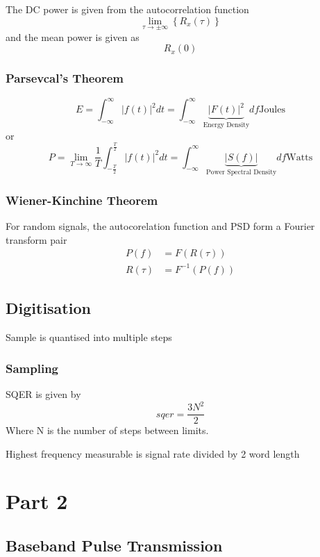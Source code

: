 \documentclass[a4paper]{article}
\newcommand{\infint}{ \int_{-\infty}^{\infty}}
\begin{document}
				The DC power is given from the autocorrelation function
				\begin{equation}
					\lim_{\tau \to \pm\infty}\left\{ R_{x}(\tau) \right\}
				\end{equation}
				and the mean power is given as
				\[R_x(0)\]

			\subsubsection{Parsevcal's Theorem}
				\begin{equation}
					E =  \infint \left| f(t)\right|^2 dt =
					\infint \underbrace{ \left| F(t)\right|^2 }_{\text{Energy Density}} df \mathrm{Joules}
				\end{equation}
				or
				\begin{equation}
					P =\lim_{T \to \infty} \frac{1}{T} \int^{\frac{T}{2}}_{-\frac{T}{2}} \left| f(t)\right|^2 dt =
					\infint \underbrace{ \left| S(f)\right| }_{\text{Power Spectral Density}} df
					\mathrm{Watts}
				\end{equation}
			\subsubsection{Wiener-Kinchine Theorem}
				For random signals, the autocorelation function and PSD form a Fourier transform pair
					\begin{align}
						P(f) &= F(R(\tau)) \\
						R(\tau) &= F^{-1}(P(f))
					\end{align}
			\subsection{Digitisation}
				Sample is quantised into multiple steps
				\subsubsection{Sampling}
				SQER is given by
					\begin{equation}
						sqer = \frac{3N^2}{2}
					\end{equation}
				Where N is the number of steps between limits.

				Highest frequency measurable is signal rate divided by 2 word length

\section{Part 2}
\subsection{Baseband Pulse Transmission}
\end{document}
